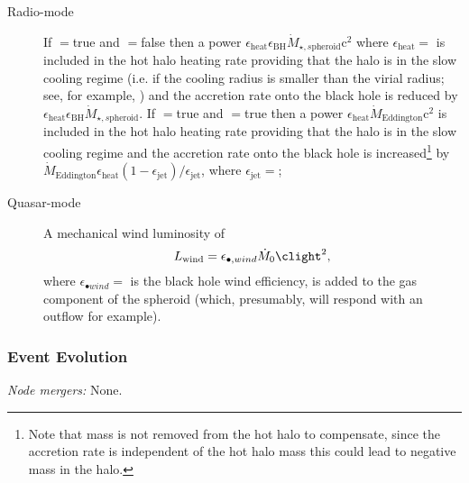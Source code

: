 \begin{description}
 \item [Radio-mode] If {\normalfont \ttfamily [blackHoleHeatsHotHalo]}$=${\normalfont \ttfamily true} and {\normalfont \ttfamily [blackHoleAccretesFromHotHalo]}$=${\normalfont \ttfamily false} then a power $\epsilon_\mathrm{heat} \epsilon_\mathrm{BH} \dot{M}_{\star,s\mathrm{pheroid}} \mathrm{c}^2$ where $\epsilon_\mathrm{heat}=${\normalfont \ttfamily [blackHoleHeatingEfficiency]} is included in the hot halo heating rate providing that the halo is in the slow cooling regime (i.e. if the cooling radius is smaller than the virial radius; see, for example, \citealt{benson_cold_2010}) and the accretion rate onto the black hole is reduced by $\epsilon_\mathrm{heat} \epsilon_\mathrm{BH} \dot{M}_{\star,s\mathrm{pheroid}}$. If {\normalfont \ttfamily [blackHoleHeatsHotHalo]}$=${\normalfont \ttfamily true} and {\normalfont \ttfamily [blackHoleAccretesFromHotHalo]}$=${\normalfont \ttfamily true} then a power $\epsilon_\mathrm{heat} \dot{M}_\mathrm{Eddington} \mathrm{c}^2$ is included in the hot halo heating rate providing that the halo is in the slow cooling regime and the accretion rate onto the black hole is increased\footnote{Note that mass is not removed from the hot halo to compensate, since the accretion rate is independent of the hot halo mass this could lead to negative mass in the halo.} by $\dot{M}_\mathrm{Eddington} \epsilon_\mathrm{heat} (1-\epsilon_\mathrm{jet})/\epsilon_\mathrm{jet}$, where $\epsilon_\mathrm{jet}=${\normalfont \ttfamily [blackHoleJetEfficiency]};
 \item [Quasar-mode] A mechanical wind luminosity of \citep{ostriker_momentum_2010}
\begin{equation}
 L_\mathrm{wind} = \epsilon_{\bullet, wind} \dot{M}_0 \clight^2,
\end{equation}
where $\epsilon_{\bullet wind}=${\normalfont \ttfamily [blackHoleWindEfficiency]} is the black hole wind efficiency, is added to the gas \gls{component} of the spheroid (which, presumably, will respond with an outflow for example).
\end{description}

\subsubsection{Event Evolution}

\noindent\emph{Node mergers:} None.\\

